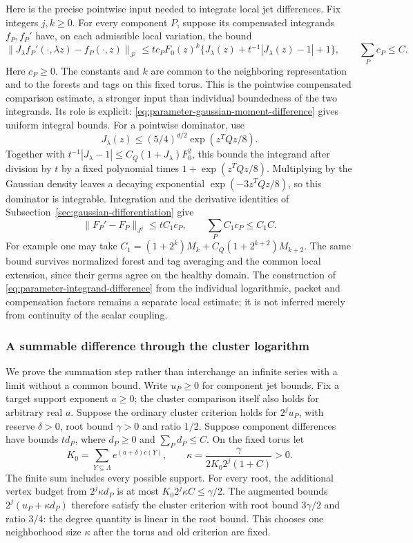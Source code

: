 Here is the precise pointwise input needed to integrate local jet
differences. Fix integers $j,k\ge0$. For every component $P$, suppose its compensated
integrands $f_P,f_P'$ have, on each admissible local variation, the
bound
\begin{equation}\label{eq:parameter-integrand-difference}
 \|J_\lambda f_P'(\cdot,\lambda z)-f_P(\cdot,z)\|_{J^j}
 \le t c_P F_0(z)^k
                 \{J_\lambda(z)+t^{-1}|J_\lambda(z)-1|+1\},
 \qquad \sum_P c_P\le C.
\end{equation}
Here $c_P\ge0$. The constants and $k$ are common to the neighboring representation
and to the forests and tags on this fixed torus. This is the
pointwise compensated comparison estimate, a stronger input than
individual boundedness of the two integrands. Its role is explicit:
\eqref{eq:parameter-gaussian-moment-difference} gives uniform integral bounds. For a pointwise dominator, use
\[
 J_\lambda(z)\le(5/4)^{d/2}\exp(z^TQz/8).
\]
Together with $t^{-1}|J_\lambda-1|\le C_Q(1+J_\lambda)F_0^2$,
this bounds the integrand after division by $t$ by a fixed polynomial
times $1+\exp(z^TQz/8)$. Multiplying by the Gaussian density leaves
a decaying exponential $\exp(-3z^TQz/8)$, so this dominator is
integrable. Integration
and the derivative identities of
Subsection~\ref{sec:gaussian-differentiation} give
\begin{equation}\label{eq:parameter-component-difference}
 \|F_P'-F_P\|_{J^j}\le t C_1c_P,
                         \qquad \sum_P C_1c_P\le C_1C.
\end{equation}
For example one may take
$C_1=(1+2^k)M_k+C_Q(1+2^{k+2})M_{k+2}$.
The same bound survives normalized forest and tag averaging and
the common local extension, since their germs agree on the healthy
domain. The construction of \eqref{eq:parameter-integrand-difference}
from the individual logarithmic, packet and compensation factors
remains a separate local estimate; it is not inferred merely from
continuity of the scalar coupling.

\subsubsection{A summable difference through the cluster logarithm}
We prove the summation step rather than interchange an infinite
series with a limit without a common bound. Write $u_P\ge0$ for
component jet bounds. Fix a target support exponent $a\ge0$; the cluster comparison itself also holds for arbitrary real $a$. Suppose the ordinary cluster criterion holds
for $2^ju_P$, with reserve $\delta>0$, root bound $\gamma>0$ and
ratio $1/2$. Suppose component differences have bounds $t d_P$,
where $d_P\ge0$ and $\sum_P d_P\le C$. On the fixed torus let
\[
 K_0=\sum_{Y\subseteq\Lambda}e^{(a+\delta)c(Y)},
 \qquad
 \kappa=\frac{\gamma}{2K_0 2^j(1+C)}>0.
\]
The finite sum includes every possible support. For every root, the
additional vertex budget from $2^j\kappa d_P$ is at most
$K_0 2^j\kappa C\le\gamma/2$. The augmented bounds
$2^j(u_P+\kappa d_P)$ therefore satisfy the cluster criterion with
root bound $3\gamma/2$ and ratio $3/4$: the degree quantity is linear
in the root bound. This chooses one neighborhood size $\kappa$
after the torus and old criterion are fixed.

